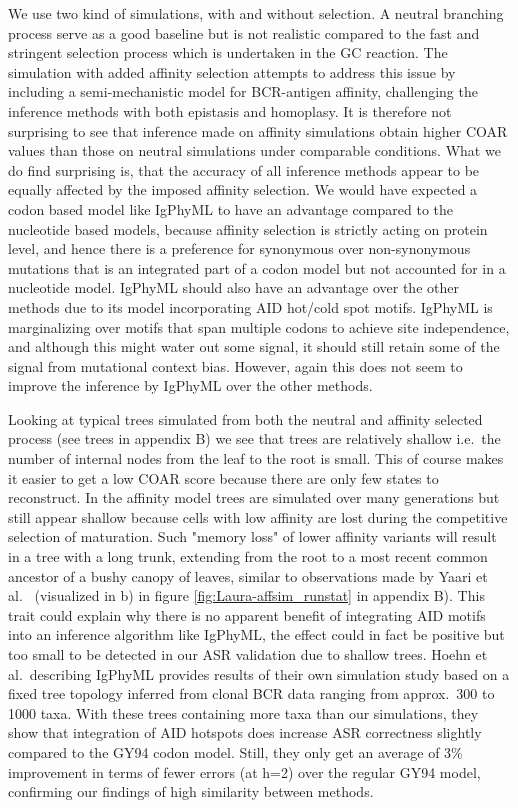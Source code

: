 We use two kind of simulations, with and without selection.
A neutral branching process serve as a good baseline but is not realistic compared to the fast and stringent selection process which is undertaken in the GC reaction.
The simulation with added affinity selection attempts to address this issue by including a semi-mechanistic model for BCR-antigen affinity, challenging the inference methods with both epistasis and homoplasy.
It is therefore not surprising to see that inference made on affinity simulations obtain higher COAR values than those on neutral simulations under comparable conditions.
What we do find surprising is, that the accuracy of all inference methods appear to be equally affected by the imposed affinity selection.
We would have expected a codon based model like IgPhyML to have an advantage compared to the nucleotide based models, because affinity selection is strictly acting on protein level, and hence there is a preference for synonymous over non-synonymous mutations that is an integrated part of a codon model but not accounted for in a nucleotide model.
IgPhyML should also have an advantage over the other methods due to its model incorporating AID hot/cold spot motifs.
IgPhyML is marginalizing over motifs that span multiple codons to achieve site independence, and although this might water out some signal, it should still retain some of the signal from mutational context bias.
However, again this does not seem to improve the inference by IgPhyML over the other methods.

Looking at typical trees simulated from both the neutral and affinity selected process (see trees in appendix B) we see that trees are relatively shallow i.e.\ the number of internal nodes from the leaf to the root is small.
This of course makes it easier to get a low COAR score because there are only few states to reconstruct.
In the affinity model trees are simulated over many generations but still appear shallow because cells with low affinity are lost during the competitive selection of maturation.
Such "memory loss" of lower affinity variants will result in a tree with a long trunk, extending from the root to a most recent common ancestor of a bushy canopy of leaves, similar to observations made by Yaari et al.\ \cite{yaari2015mutation} (visualized in b) in figure \ref{fig:Laura-affsim_runstat} in appendix B).
This trait could explain why there is no apparent benefit of integrating AID motifs into an inference algorithm like IgPhyML, the effect could in fact be positive but too small to be detected in our ASR validation due to shallow trees.
Hoehn et al.\ describing IgPhyML provides results of their own simulation study based on a fixed tree topology inferred from clonal BCR data ranging from approx.\ 300 to 1000 taxa.
With these trees containing more taxa than our simulations, they show that integration of AID hotspots does increase ASR correctness slightly compared to the GY94 codon model.
Still, they only get an average of 3\% improvement in terms of fewer errors (at h=2) over the regular GY94 model, confirming our findings of high similarity between methods.

